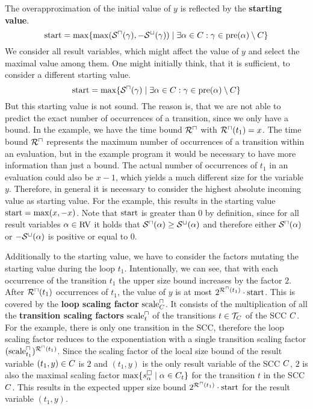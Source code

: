The overapproximation of the initial value of $y$ is reflected by the \textbf{starting value}.
\[ \text{start} = \max \lbrace \max({\mathcal{S}^\sqcap}(\gamma), -{\mathcal{S}^\sqcup}(\gamma)) \mid \exists \alpha \in C: \gamma \in \text{pre}(\alpha) \setminus C \rbrace \]
We consider all result variables, which might affect the value of $y$ and select the maximal value among them.
One might initially think, that it is sufficient, to consider a different starting value.
\[ \text{start} = \max \lbrace {\mathcal{S}^\sqcap}(\gamma) \mid \exists \alpha \in C: \gamma \in \text{pre}(\alpha) \setminus C \rbrace \]
But this starting value is not sound.
The reason is, that we are not able to predict the exact number of occurrences of a transition, since we only have a bound.
In the example, we have the time bound ${\mathcal{R}^\sqcap}$ with ${\mathcal{R}^\sqcap}(t_1) = x$.
The time bound ${\mathcal{R}^\sqcap}$ represents the maximum number of occurrences of a transition within an evaluation, but in the example program it would be necessary to have more information than just a bound.
The actual number of occurrences of $t_1$ in an evaluation could also be $x-1$, which yields a much different size for the variable $y$.
Therefore, in general it is necessary to consider the highest absolute incoming value as starting value.
For the example, this results in the starting value $\text{start} = \max(x, -x)$.
Note that $\text{start}$ is greater than $0$ by definition, since for all result variables $\alpha \in \text{RV}$ it holds that ${\mathcal{S}^\sqcap}(\alpha) \geq {\mathcal{S}^\sqcup}(\alpha)$ and therefore either ${\mathcal{S}^\sqcap}(\alpha)$ or $-{\mathcal{S}^\sqcup}(\alpha)$ is positive or equal to $0$.

Additionally to the starting value, we have to consider the factors mutating the starting value during the loop $t_1$.
Intentionally, we can see, that with each occurrence of the transition $t_1$ the upper size bound increases by the factor $2$.
After ${\mathcal{R}^\sqcap}(t_1)$ occurrences of $t_1$, the value of $y$ is at most $2^{{\mathcal{R}^\sqcap}(t_1)} \cdot \text{start}$.
This is covered by the \textbf{loop scaling factor} $\text{scale}^\sqcap_C$.
It consists of the multiplication of all the \textbf{transition scaling factors} $\text{scale}^\sqcap_t$ of the transitions $t \in \mathcal{T}_C$ of the SCC $C$.
For the example, there is only one transition in the SCC, therefore the loop scaling factor reduces to the exponentiation with a single transition scaling factor $(\text{scale}^\sqcap_{t_1})^{{\mathcal{R}^\sqcap}(t_1)}$.
Since the scaling factor of the local size bound of the result variable $(t_1,y) \in C$ is $2$ and $(t_1,y)$ is the only result variable of the SCC $C$, $2$ is also the maximal scaling factor $\max \lbrace s^\square_{\alpha} \mid \alpha \in C_t \rbrace$ for the transition $t$ in the SCC $C$.
This results in the expected upper size bound $2^{{\mathcal{R}^\sqcap}(t_1)} \cdot \text{start}$ for the result variable $(t_1,y)$.

